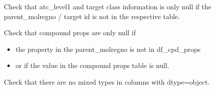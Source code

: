 \documentclass[letterpaper,10pt,english]{sphinxmanual}
\begin{document}
\begin{fulllineitems}
\label{\detokenize{sanity_checks:sanity_checks.check_atc_and_target_classes}}
\pysigstartsignatures
{}
\pysigstopsignatures
\sphinxAtStartPar
Check that atc\_level1 and target class information is only null
if the parent\_molregno / target id is not in the respective table.

\end{fulllineitems}


\begin{fulllineitems}
\label{\detokenize{sanity_checks:sanity_checks.check_compound_props}}
\pysigstartsignatures
{}
\pysigstopsignatures
\sphinxAtStartPar
Check that compound props are only null if
\begin{itemize}
\item {} 
\sphinxAtStartPar
the property in the parent\_molregno is not in df\_cpd\_props

\item {} 
\sphinxAtStartPar
or if the value in the compound props table is null.

\end{itemize}

\end{fulllineitems}


\begin{fulllineitems}
\label{\detokenize{sanity_checks:sanity_checks.check_for_mixed_types}}
\pysigstartsignatures
{}
\pysigstopsignatures
\sphinxAtStartPar
Check that there are no mixed types in columns with dtype=object.

\end{fulllineitems}
\end{document}
